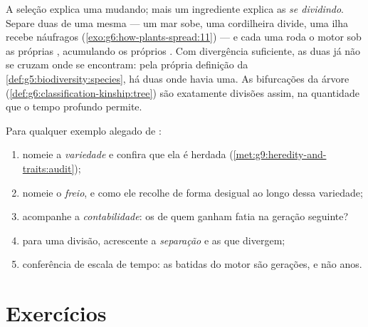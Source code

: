 \begin{proposition}\label{prop:g9:how-species-change:speciation}
A seleção explica uma  mudando; mais um ingrediente
explica as  \emph{se dividindo}. Separe duas
 de uma mesma  --- um mar sobe, uma
cordilheira divide, uma ilha recebe náufragos
(\cref{exo:g6:how-plants-spread:11}) --- e cada uma roda o
motor sob as próprias , acumulando os próprios
. Com divergência suficiente, as duas já não se cruzam
onde se encontram: pela própria definição da
\cref{def:g5:biodiversity:species}, há duas  onde
havia uma. As bifurcações da árvore
(\cref{def:g6:classification-kinship:tree}) são exatamente
divisões assim, na quantidade que o tempo profundo permite.
\end{proposition}
\admitted

\begin{method}\label{met:g9:how-species-change:run}
Para qualquer exemplo alegado de :
\begin{enumerate}
  \item nomeie a \emph{variedade} e confira que ela é herdada
        (\cref{met:g9:heredity-and-traits:audit});
  \item nomeie o \emph{freio}, e como ele recolhe de forma
        desigual ao longo dessa variedade;
  \item acompanhe a \emph{contabilidade}: os  de quem
        ganham fatia na geração seguinte?
  \item para uma divisão, acrescente a \emph{separação} e as
         que divergem;
  \item conferência de escala de tempo: as batidas do motor
        são gerações, e não anos.
\end{enumerate}
\end{method}

\section{Exercícios}

